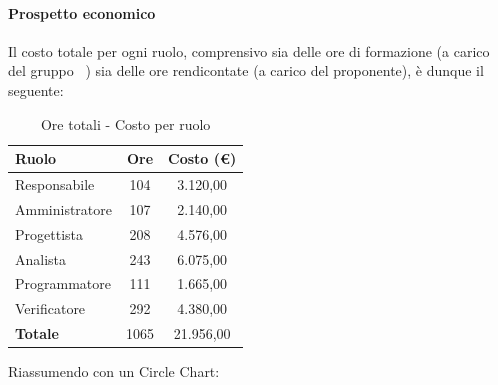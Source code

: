 \documentclass[../PianoProgetto.tex]{subfiles}
\begin{document}
\vfill	
	
	\paragraph{Prospetto economico}
					Il costo totale per ogni ruolo, comprensivo sia delle ore di formazione (a carico del gruppo \leaf\ ) sia delle ore rendicontate (a carico del proponente), è dunque il seguente:
	\begin{table}[h]
		\centering
		\begin{tabular}{l * {2}{c}}
			\toprule
			\textbf{Ruolo} & \textbf{Ore} & \textbf{Costo (\euro{})} \\
			\midrule
			Responsabile &	104 & 3.120,00 \\
			Amministratore & 107 & 2.140,00 \\
			Progettista & 208 & 4.576,00 \\
			Analista & 243 & 6.075,00 \\
			Programmatore & 111 & 1.665,00 \\
			Verificatore & 292 & 4.380,00 \\
			\midrule		
			\textbf{Totale} & 1065 &  21.956,00 \\
			\bottomrule
		\end{tabular}
		\caption{Ore totali - Costo per ruolo}
		\label{tab:totale_costo}
	\end{table}
\vfill
\newpage	
\vfill
	Riassumendo con un Circle Chart:
\end{document}

